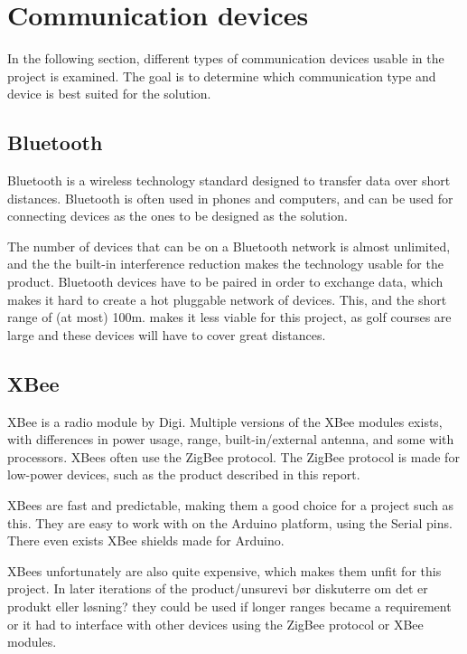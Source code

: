 \section{Communication devices}
In the following section, different types of communication devices usable in the project is examined. The goal is to determine which communication type and device is best suited for the solution.

\subsection{Bluetooth}
Bluetooth is a wireless technology standard designed to transfer data over short distances. Bluetooth is often used in phones and computers, and can be used for connecting devices as the ones to be designed as the solution. 

The number of devices that can be on a Bluetooth network is almost unlimited, and the the built-in interference reduction makes the technology usable for the product\cite{bluetoothbasics}.
Bluetooth devices have to be paired in order to exchange data, which makes it hard to create a hot pluggable network of devices. This, and the short range of (at most) 100m\cite{bluetoothbasics}. makes it less viable for this project, as golf courses are large and these devices will have to cover great distances.

\subsection{XBee}
XBee is a radio module by Digi. Multiple versions of the XBee modules exists, with differences in power usage, range, built-in/external antenna, and some with processors\cite{sparkfunXbeeGuide}.
XBees often use the ZigBee protocol. The ZigBee protocol is made for low-power devices, such as the product described in this report\cite{zigbee}.

XBees are fast and predictable, making them a good choice for a project such as this. They are easy to work with on the Arduino platform, using the Serial pins. There even exists XBee shields made for Arduino.

XBees unfortunately are also quite expensive, which makes them unfit for this project. In later iterations of the product/unsure{vi bør diskuterre om det er produkt eller løsning?}  they could be used if longer ranges became a requirement or it had to interface with other devices using the ZigBee protocol or XBee modules.

